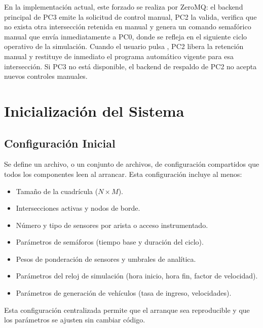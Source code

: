 \documentclass[12pt, a4paper]{article}
\let\oldtexttt\texttt
\renewcommand{\texttt}[1]{\oldtexttt{\seqsplit{#1}}}
\begin{document}
En la implementación actual, este forzado se realiza por ZeroMQ: el backend principal de PC3 emite la solicitud de control manual, PC2 la valida, verifica que no exista otra intersección retenida en manual y genera un comando semafórico manual que envía inmediatamente a PC0, donde se refleja en el siguiente ciclo operativo de la simulación. Cuando el usuario pulsa \texttt{Automatico}, PC2 libera la retención manual y restituye de inmediato el programa automático vigente para esa intersección. Si PC3 no está disponible, el backend de respaldo de PC2 no acepta nuevos controles manuales.



\section{Inicialización del Sistema}

\subsection{Configuración Inicial}

Se define un archivo, o un conjunto de archivos, de configuración compartidos que todos los componentes leen al arrancar. Esta configuración incluye al menos:

\begin{itemize}
    \item Tamaño de la cuadrícula ($N\!\times\!M$).
    \item Intersecciones activas y nodos de borde.
    \item Número y tipo de sensores por arista o acceso instrumentado.
    \item Parámetros de semáforos (tiempo base y duración del ciclo).
    \item Pesos de ponderación de sensores y umbrales de analítica.
    \item Parámetros del reloj de simulación (hora inicio, hora fin, factor de velocidad).
    \item Parámetros de generación de vehículos (tasa de ingreso, velocidades).
\end{itemize}

Esta configuración centralizada permite que el arranque sea reproducible y que los parámetros se ajusten sin cambiar código.
\end{document}
